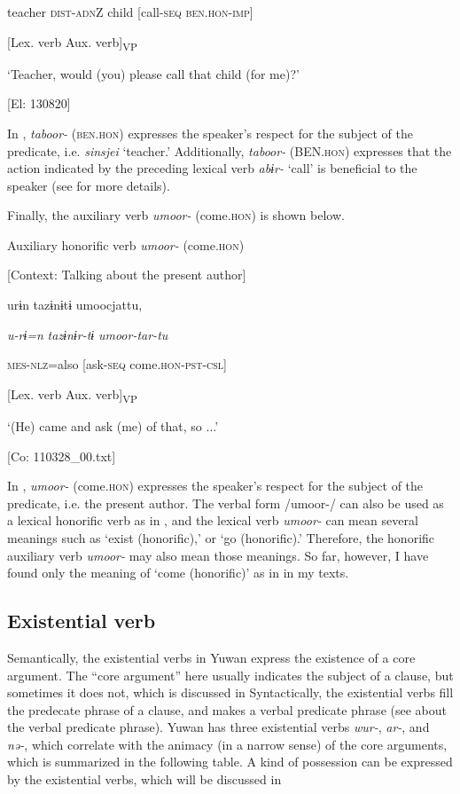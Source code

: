     teacher  \textsc{dist}-\textsc{adn}Z  child  [call-\textsc{seq}  \textsc{ben}.\textsc{hon}-\textsc{imp}]

          [Lex. verb  Aux. verb]\textsubscript{VP}

    ‘Teacher, would (you) please call that child (for me)?’

    [El: 130820]

In , \textit{taboor-} (\textsc{ben}.\textsc{hon}) expresses the speaker’s respect for the subject of the predicate, i.e. \textit{sinsjei} ‘teacher.’ Additionally, \textit{taboor-} (BEN.\textsc{hon}) expresses that the action indicated by the preceding lexical verb \textit{abɨr-} ‘call’ is beneficial to the speaker (see  for more details).

  Finally, the auxiliary verb \textit{umoor-} (come.\textsc{hon}) is shown below.

\textbf{\ea\label{ex:8-27}
}  Auxiliary honorific verb \textit{umoor-} (come.\textsc{hon})

  [Context: Talking about the present author]

 {\US}
\glll   urɨn  tazɨnɨtɨ  umoocjattu,

    \textit{u-rɨ=n}  \textit{tazɨnɨr-tɨ}  \textit{umoor{}-tar-tu}

    \textsc{mes}-\textsc{nlz}=also  [ask-\textsc{seq}  come.\textsc{hon}-\textsc{pst}-\textsc{csl}]

      [Lex. verb  Aux. verb]\textsubscript{VP}

    ‘(He) came and ask (me) of that, so ...’

    [Co: 110328\_00.txt]
\z

In , \textit{umoor-} (come.\textsc{hon}) expresses the speaker’s respect for the subject of the predicate, i.e. the present author. The verbal form /umoor-/ can also be used as a lexical honorific verb as in , and the lexical verb \textit{umoor-} can mean several meanings such as ‘exist (honorific),’ or ‘go (honorific).’ Therefore, the honorific auxiliary verb \textit{umoor-} may also mean those meanings. So far, however, I have found only the meaning of ‘come (honorific)’ as in  in my texts.

\subsection{Existential verb}

Semantically, the existential verbs in Yuwan express the existence of a core argument. The “core argument” here usually indicates the subject of a clause, but sometimes it does not, which is discussed in  Syntactically, the existential verbs fill the predecate phrase of a clause, and makes a verbal predicate phrase (see  about the verbal predicate phrase). Yuwan has three existential verbs \textit{wur-}, \textit{ar-}, and \textit{nə-}, which correlate with the animacy (in a narrow sense) of the core arguments, which is summarized in the following table. A kind of possession can be expressed by the existential verbs, which will be discussed in 

